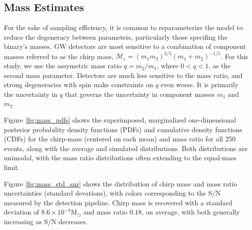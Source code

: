 \subsection{Mass Estimates}

For the sake of sampling efficiency, it is common to reparameterize the model to reduce the degeneracy between parameters, particularly those specifing the binary's masses.  GW detectors are most sensitive to a combination of component masses referred to as the chirp mass, $\mathcal{M}_\mathrm{c} = (m_1 m_2)^{3/5} (m_1 + m_2)^{-1/5}$.  For this study, we use the assymetric mass ratio $q = m_2/m_1$, where $0 < q < 1$, as the second mass parameter.  Detectors are much less sensitive to the mass ratio, and strong degeneracies with spin make constraints on $q$ even worse.  It is primarily the uncertainty in $q$ that governs the uncertainty in component masses $m_1$ and $m_2$.

Figure \ref{fig:mass_pdfs} shows the superimposed, marginalized one-dimensional posterior probability density functions (PDFs) and cumulative density functions (CDFs) for the chirp-mass (centered on each mean) and mass ratio for all 250 events, along with the average and simulated distributions.  Both distributions are unimodal, with the mass ratio distributions often extending to the equal-mass limit.

Figure \ref{fig:mass_std_snr} shows the distribution of chirp mass and mass ratio uncertainties (standard devations), with colors corresponding to the S/N measured by the detection pipeline.  Chirp mass is recovered with a standard deviation of $8.6 \times 10^{-4} \mathrm{M}_\odot$ and mass ratio $0.18$, on average, with both generally increasing as S/N decreases.